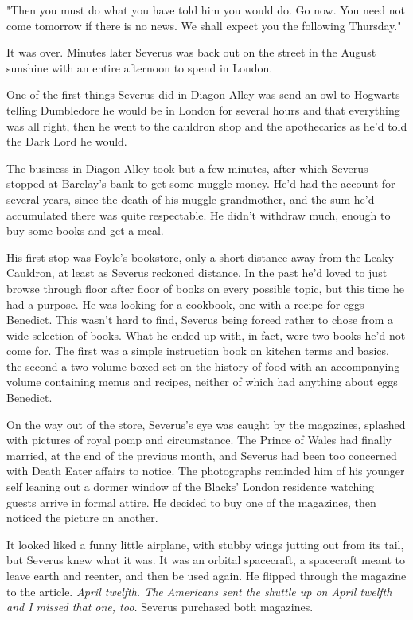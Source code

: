 "Then you must do what you have told him you would do. Go now. You need not come tomorrow if there is no news. We shall expect you the following Thursday."

It was over. Minutes later Severus was back out on the street in the August sunshine with an entire afternoon to spend in London.

One of the first things Severus did in Diagon Alley was send an owl to Hogwarts telling Dumbledore he would be in London for several hours and that everything was all right, then he went to the cauldron shop and the apothecaries as he'd told the Dark Lord he would.

The business in Diagon Alley took but a few minutes, after which Severus stopped at Barclay's bank to get some muggle money. He'd had the account for several years, since the death of his muggle grandmother, and the sum he'd accumulated there was quite respectable. He didn't withdraw much, enough to buy some books and get a meal.

His first stop was Foyle's bookstore, only a short distance away from the Leaky Cauldron, at least as Severus reckoned distance. In the past he'd loved to just browse through floor after floor of books on every possible topic, but this time he had a purpose. He was looking for a cookbook, one with a recipe for eggs Benedict. This wasn't hard to find, Severus being forced rather to chose from a wide selection of books. What he ended up with, in fact, were two books he'd not come for. The first was a simple instruction book on kitchen terms and basics, the second a two-volume boxed set on the history of food with an accompanying volume containing menus and recipes, neither of which had anything about eggs Benedict.

On the way out of the store, Severus's eye was caught by the magazines, splashed with pictures of royal pomp and circumstance. The Prince of Wales had finally married, at the end of the previous month, and Severus had been too concerned with Death Eater affairs to notice. The photographs reminded him of his younger self leaning out a dormer window of the Blacks' London residence watching guests arrive in formal attire. He decided to buy one of the magazines, then noticed the picture on another.

It looked liked a funny little airplane, with stubby wings jutting out from its tail, but Severus knew what it was. It was an orbital spacecraft, a spacecraft meant to leave earth and reenter, and then be used again. He flipped through the magazine to the article. \emph{April twelfth. The Americans sent the shuttle up on April twelfth and I missed that one, too.} Severus purchased both magazines.

